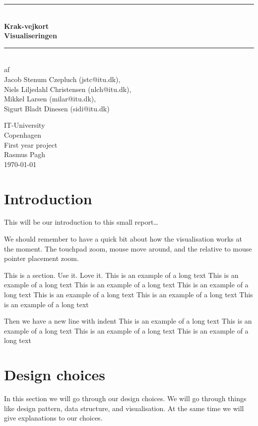 \documentclass[a4paper,11pt]{article}
\begin{document}
\begin{titlepage}
\centering \parindent=0pt
\newcommand{\HRule}{\rule{\textwidth}{1mm}}
 \HRule\\[1cm]\Huge\bfseries
Krak-vejkort\\[0.7cm]
\large Visualiseringen\\[1cm]
\HRule\\[4cm]  \large af \\Jacob Stenum Czepluch (jstc@itu.dk), \\Niels Liljedahl Christensen (nlch@itu.dk), \\Mikkel Larsen (milar@itu.dk), \\Sigurt Bladt Dinesen (sidi@itu.dk) \\
 \normalsize %
\begin{flushleft}
IT-University\\
Copenhagen\\
First year project\\
Rasmus Pagh\\
\today \end{flushleft}
\end{titlepage}

\tableofcontents
\pagebreak

\pagebreak
\section{Introduction}

This will be our introduction to this small report\ldots

We should remember to have a quick bit about how the visualisation works at the moment. The touchpad zoom, mouse move around, and the relative to
mouse pointer placement zoom.

This is a section. Use it. Love it.
This is an example of a long text
This is an example of a long text
This is an example of a long text
This is an example of a long text
This is an example of a long text
This is an example of a long text
This is an example of a long text

Then we have a new line with indent
This is an example of a long text
This is an example of a long text
This is an example of a long text
This is an example of a long text

\pagebreak
\section{Design choices} %
\label{sec:Design choices}
In this section we will go through our design choices. We will go through things like design pattern, data structure, and visualisation.
At the same time we will give explanations to our choices.
\end{document}
